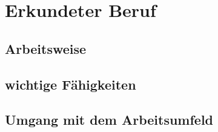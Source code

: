 \chapter{Erkundeter Beruf}



\section{Arbeitsweise}



\section{wichtige Fähigkeiten}



\section{Umgang mit dem Arbeitsumfeld}